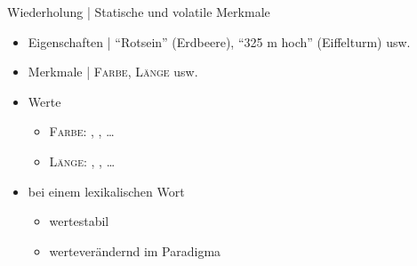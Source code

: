 \begin{frame}
  {Wiederholung | Statische und volatile Merkmale}
  \pause
  \begin{itemize}[<+->]
    \item Eigenschaften | "`Rotsein"' (Erdbeere), "`325 m hoch"' (Eiffelturm) usw.
    \item Merkmale | \alert{\textsc{Farbe}}, \alert{\textsc{Länge}} usw.
    \item Werte
      \begin{itemize}[<+->]
        \item \alert{\textsc{Farbe}}: , , \ldots
        \item \alert{\textsc{Länge}}: \rot{\textit{3 cm}}, , \ldots
      \end{itemize}
  \end{itemize}
  \pause
  \Halbzeile 
  \begin{exe}
    \ex
    \begin{xlist}
      \pause
      \pause
    \end{xlist}
  \end{exe}
  \Halbzeile
  \pause
  \begin{itemize}[<+->]
    \item bei einem lexikalischen Wort
      \begin{itemize}
        \item {} wertestabil
        \item {} werteverändernd im Paradigma
      \end{itemize}
  \end{itemize}
\end{frame}

